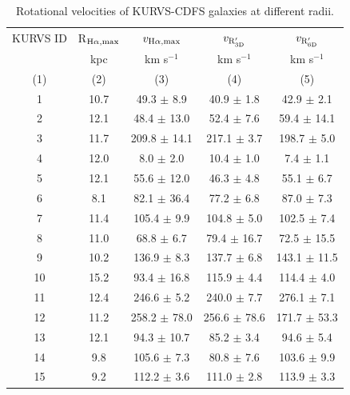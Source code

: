 \begin{table}
\centering
\caption{{Rotational velocities of KURVS-CDFS galaxies at different radii.}}
\label{tab3:radii}
\begin{tabular}{ccccc} 
\hline
\hline
KURVS ID & R$_{\rm H\alpha, max}$  & $v_{\rm H\alpha, max}$ & $v_{\rm R'_{\rm 3D}}$ & $v_{\rm R'_{\rm 6D}}$ \\
 & kpc & km s$^{-1}$  & km s$^{-1}$ & km s$^{-1}$   \\
  (1) & (2) & (3) & (4)  & (5) \\
\hline
  1    &    10.7 &    49.3   $\pm$  8.9  &    40.9   $\pm$  1.8   &     42.9   $\pm$  2.1         \\  
  2    &    12.1 &    48.4   $\pm$  13.0 &    52.4   $\pm$  7.6   &     59.4   $\pm$  14.1        \\  
  3    &    11.7 &    209.8  $\pm$  14.1 &    217.1  $\pm$  3.7   &     198.7  $\pm$  5.0         \\  
  4    &    12.0 &    8.0    $\pm$  2.0  &    10.4   $\pm$  1.0   &     7.4    $\pm$  1.1         \\  
  5    &    12.1 &    55.6   $\pm$  12.0 &    46.3   $\pm$  4.8   &     55.1   $\pm$  6.7         \\  
  6    &    8.1  &    82.1   $\pm$  36.4 &    77.2   $\pm$  6.8   &     87.0   $\pm$  7.3         \\  
  7    &    11.4 &    105.4  $\pm$  9.9  &    104.8  $\pm$  5.0   &     102.5  $\pm$  7.4         \\  
  8    &    11.0 &    68.8   $\pm$  6.7  &    79.4   $\pm$  16.7  &     72.5   $\pm$  15.5        \\  
  9    &    10.2 &    136.9  $\pm$  8.3  &    137.7  $\pm$  6.8   &     143.1  $\pm$  11.5        \\  
  10   &    15.2 &    93.4   $\pm$  16.8 &    115.9  $\pm$  4.4   &     114.4  $\pm$  4.0         \\  
  11   &    12.4 &    246.6  $\pm$  5.2  &    240.0  $\pm$  7.7   &     276.1  $\pm$  7.1         \\  
  12   &    11.2 &    258.2  $\pm$  78.0 &    256.6  $\pm$  78.6  &     171.7  $\pm$  53.3        \\  
  13   &    12.1 &    94.3   $\pm$  10.7 &    85.2   $\pm$  3.4   &     94.6   $\pm$  5.4         \\  
  14   &    9.8  &    105.6  $\pm$  7.3  &    80.8   $\pm$  7.6   &     103.6  $\pm$  9.9         \\  
  15   &    9.2  &    112.2  $\pm$  3.6  &    111.0  $\pm$  2.8   &     113.9  $\pm$  3.3         \\  

\end{tabular}
\end{table}

